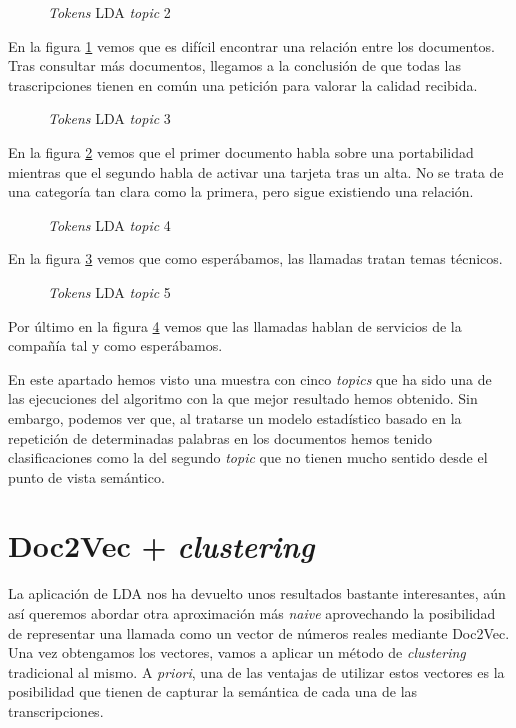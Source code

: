 \begin{figure}[!ht]
	\centering
    \caption{\textit{Tokens} LDA \textit{topic} 2}
    \label{fig:lda_topic2}
\end{figure}

En la figura \ref{fig:lda_topic2} vemos que es difícil encontrar una relación entre los documentos. Tras consultar más documentos, llegamos a la conclusión de que todas las trascripciones tienen en común una petición para valorar la calidad recibida.

\begin{figure}[!ht]
	\centering
    \caption{\textit{Tokens} LDA \textit{topic} 3}
    \label{fig:lda_topic3}
\end{figure}

En la figura \ref{fig:lda_topic3} vemos que el primer documento habla sobre una portabilidad mientras que el segundo habla de activar una tarjeta tras un alta. No se trata de una categoría tan clara como la primera, pero sigue existiendo una relación.

\begin{figure}[!ht]
	\centering
    \caption{\textit{Tokens} LDA \textit{topic} 4}
    \label{fig:lda_topic4}
\end{figure}


En la figura \ref{fig:lda_topic4} vemos que como esperábamos, las llamadas tratan temas técnicos. 


\begin{figure}[!ht]
	\centering
    \caption{\textit{Tokens} LDA \textit{topic} 5}
    \label{fig:lda_topic5}
\end{figure}

Por último en la figura \ref{fig:lda_topic5} vemos que las llamadas hablan de servicios de la compañía tal y como esperábamos. 

En este apartado hemos visto una muestra con cinco \textit{topics} que ha sido una de las ejecuciones del algoritmo con la que  mejor resultado hemos obtenido. Sin embargo, podemos ver que, al tratarse un modelo estadístico basado en la repetición de determinadas palabras en los documentos hemos tenido clasificaciones como la del segundo \textit{topic} que no tienen mucho sentido desde el punto de vista semántico.

\section{Doc2Vec + \textit{clustering}}
\label{section:nosup:birch}
La aplicación de LDA nos ha devuelto unos resultados bastante interesantes, aún así queremos abordar otra aproximación más \textit{naive} aprovechando la posibilidad de representar una llamada como un vector de números reales mediante Doc2Vec. Una vez obtengamos los vectores, vamos a aplicar un método de \textit{clustering} tradicional al mismo. A \textit{priori}, una de las ventajas de utilizar estos vectores es la posibilidad que tienen de capturar la semántica de cada una de las transcripciones.

